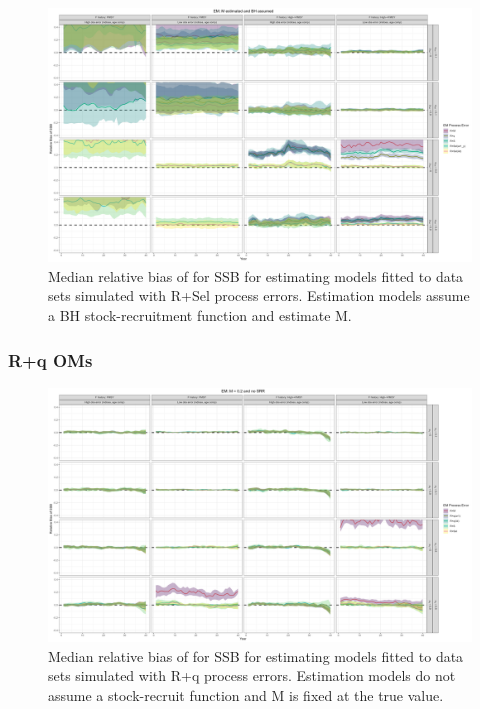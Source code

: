 \documentclass[
  12pt,
]{article}
\begin{document}
\begin{landscape}
\begin{figure}
\caption{Median relative bias of for SSB for estimating models fitted to data sets simulated with R+Sel process errors. Estimation models assume a BH stock-recruitment function and estimate M.}\label{Sel_om_em_BH_ME_relbias_ssb}
\begin{center}
\includegraphics[width = \textwidth]{Sel_om_BH_ME_relbias_ssb.png}
\end{center}
\end{figure}
\end{landscape}

\hypertarget{rq-oms}{%
\subsubsection*{R+q OMs}\label{rq-oms}}

\begin{landscape}
\begin{figure}
\caption{Median relative bias of for SSB for estimating models fitted to data sets simulated with R+q process errors.  Estimation models do not assume a stock-recruit function and M is fixed at the true value.}\label{q_om_em_R_MF_relbias_ssb}
\begin{center}
\includegraphics[width = \textwidth]{q_om_R_MF_relbias_ssb.png}
\end{center}
\end{figure}
\end{landscape}
\end{document}
